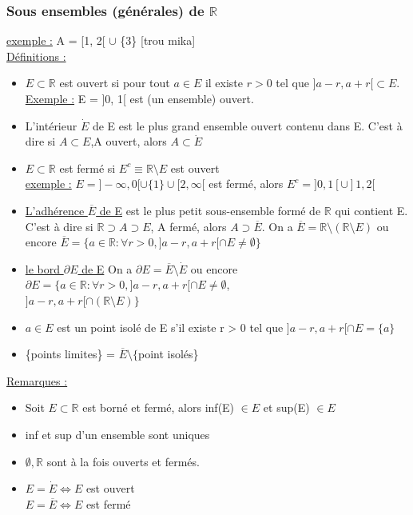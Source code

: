 \documentclass[12pt,a4paper]{article}
\newcommand{\R}{\ensuremath{\mathbb{R}} }
\begin{document}
\subsubsection{Sous ensembles (générales) de $\R$}
\underline{exemple :} A = [1, 2[ $\cup$ \{3\}
[trou mika]\\
\underline{Définitions :}
\begin{itemize}
\item $E \subset \R$ est ouvert si pour tout $a \in E$ il existe $r > 0$ tel que $]a-r, a+r[ \subset E$.\\
\underline{Exemple :} E = ]0, 1[ est (un ensemble) ouvert. 
\item L'intérieur $\dot{E}$ de E est le plus grand ensemble ouvert contenu dans E. C'est à dire si $A \subset E$,A ouvert, alors $A \subset \dot{E}$
	\item $E \subset \R$ est fermé si $E^c \equiv \R\setminus E$ est ouvert\\
	\underline{exemple :} $E = ]-\infty, 0[ \cup \{1\}\cup [2,\infty[$ est fermé, alors $E^c = ]0, 1[ \cup ]1, 2[$
	\item \underline{L'adhérence $\overline{E}$ de E} est le plus petit sous-ensemble formé de $\R$ qui contient E. C'est à dire si $\R \supset A \supset E$, A fermé, alors $A \supset \overline{E}$. On a $\overline{E} = \R \setminus (\R \setminus E)$ ou encore $\overline{E} = \{a \in \R : \forall r > 0, ]a-r, a+r[ \cap E \neq \emptyset\}$
	\item \underline{le bord $\partial E$ de E} On a $\partial E = \overline{E} \setminus \dot{E}$ ou encore $\partial E = \{a \in \R : \forall r >0, ]a-r, a+r[ \cap E \neq \emptyset$,\\
	$]a-r, a+r[ \cap (\R \setminus E) \}$
	\item $a \in E$ est un point isolé de E s'il existe r > 0 tel que $]a-r,a+r[ \cap E = \{a\}$
	\item \{points limites\} = $\overline{E} \setminus \{$point isolés\}
\end{itemize}

\underline{Remarques :}
\begin{itemize}
\item Soit $E \subset \R$ est borné et fermé, alors inf(E) $\in E$ et sup(E) $\in E$
\item inf et sup d'un ensemble sont uniques
\item $\emptyset, \R$ sont à la fois ouverts et fermés.
\item $E = \dot{E} \Leftrightarrow E$ est ouvert\\
$E = \overline{E} \Leftrightarrow E$ est fermé
\end{itemize}
\end{document}
